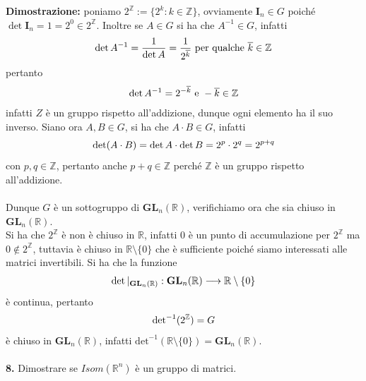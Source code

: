 \documentclass{article}
\begin{document}
\textbf{Dimostrazione:} poniamo $2^{\mathbb{Z}} := \{ 2^k : k \in \mathbb{Z} \}$, ovviamente $\mathbf{I}_n \in G$ poiché $\det \mathbf{I}_n = 1 = 2^0 \in 2^{\mathbb{Z}}$. Inoltre se $A \in G$ si ha che $A^{-1} \in G$, infatti
\begin{gather}
    \det A^{-1} = \frac{1}{\det A} = \frac{1}{2^{\overline{k}}} \text{ per qualche } \overline{k} \in \mathbb{Z} \notag
\end{gather}
pertanto
\begin{gather}
    \det A^{-1} = 2^{-\overline{k}} \text{ e } -\overline{k} \in \mathbb{Z} \notag
\end{gather}
infatti $Z$ è un gruppo rispetto all'addizione, dunque ogni elemento ha il suo inverso. Siano ora $A, B \in G$, si ha che $A \cdot B \in G$, infatti
\begin{gather}
    \det (A \cdot B) = \det A \cdot \det B = 2^p \cdot 2^q = 2^{p + q} \notag
\end{gather}
con $p, q \in \mathbb{Z}$, pertanto anche $p + q \in \mathbb{Z}$ perché $\mathbb{Z}$ è un gruppo rispetto all'addizione. \\ \\
Dunque $G$ è un sottogruppo di $\mathbf{GL}_n(\mathbb{R})$, verifichiamo ora che sia chiuso in $\mathbf{GL}_n(\mathbb{R})$. \\
Si ha che $2^{\mathbb{Z}}$ è non è chiuso in $\mathbb{R}$, infatti $0$ è un punto di accumulazione per $2^{\mathbb{Z}}$ ma $0 \not\in 2^{\mathbb{Z}}$, tuttavia è chiuso in $\mathbb{R} \setminus \{ 0 \}$ che è sufficiente poiché siamo interessati alle matrici invertibili. Si ha che la funzione
\begin{gather}
    \det|_{\mathbf{GL}_n(\mathbb{R})} : \mathbf{GL}_n(\mathbb{R}) \longrightarrow \mathbb{R} \setminus \{ 0 \} \notag
\end{gather}
è continua, pertanto
\begin{gather}
    \mathrm{det}^{-1}(2^{\mathbb{Z}}) = G \notag
\end{gather}
è chiuso in $\mathbf{GL}_n(\mathbb{R})$, infatti $\mathrm{det}^{-1}(\mathbb{R} \setminus \{ 0 \}) = \mathbf{GL}_n(\mathbb{R})$. \\ \\
\textbf{8.} Dimostrare se $Isom(\mathbb{R}^n)$ è un gruppo di matrici. \\
\end{document}
